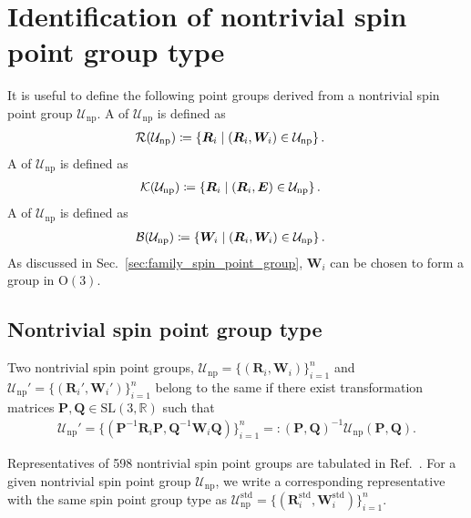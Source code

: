\section{Identification of nontrivial spin point group type}

\todo{}

It is useful to define the following point groups derived from a nontrivial spin point group $\mathcal{U}_{\mathrm{np}}$.
A  of $\mathcal{U}_{\mathrm{np}}$ is defined as
\begin{align}
  \mathcal{R}(\mathcal{U}_{\mathrm{np}})
    &\coloneqq \left\{  \bm{R}_{i}  \mathrel{}\middle|\mathrel{}  (\bm{R}_{i}, \bm{W}_{i}) \in \mathcal{U}_{\mathrm{np}}  \right\}.
\end{align}
A  of $\mathcal{U}_{\mathrm{np}}$ is defined as
\begin{align}
  \mathcal{K}(\mathcal{U}_{\mathrm{np}})
    &\coloneqq \left\{  \bm{R}_{i}  \mathrel{}\middle|\mathrel{}  (\bm{R}_{i}, \bm{E}) \in \mathcal{U}_{\mathrm{np}}  \right\}.
\end{align}
A  of $\mathcal{U}_{\mathrm{np}}$ is defined as
\begin{align}
  \mathcal{B}(\mathcal{U}_{\mathrm{np}})
    &\coloneqq \left\{  \bm{W}_{i}  \mathrel{}\middle|\mathrel{}  (\bm{R}_{i}, \bm{W}_{i}) \in \mathcal{U}_{\mathrm{np}}  \right\}.
\end{align}
As discussed in Sec.~\ref{sec:family_spin_point_group}, $\bm{W}_{i}$ can be chosen to form a group in $\mathrm{O}(3)$.

\subsection{Nontrivial spin point group type}

Two nontrivial spin point groups, $\mathcal{U}_{\mathrm{np}} = \{ (\bm{R}_{i}, \bm{W}_{i}) \}_{i=1}^{n}$ and $\mathcal{U}_{\mathrm{np}}'= \{ (\bm{R}_{i}', \bm{W}_{i}') \}_{i=1}^{n}$ belong to the same  if there exist transformation matrices $\bm{P}, \bm{Q} \in \mathrm{SL}(3, \mathbb{R})$ such that
\begin{align}
  \mathcal{U}_{\mathrm{np}}'
    = \{ (\bm{P}^{-1} \bm{R}_{i} \bm{P}, \bm{Q}^{-1} \bm{W}_{i} \bm{Q}) \}_{i=1}^{n}
    =: (\bm{P}, \bm{Q})^{-1} \mathcal{U}_{\mathrm{np}} (\bm{P}, \bm{Q}).
\end{align}

Representatives of 598 nontrivial spin point groups are tabulated in Ref.~\cite{Litvin:a14103}.
For a given nontrivial spin point group $\mathcal{U}_{\mathrm{np}}$, we write a corresponding representative with the same spin point group type as $\mathcal{U}_{\mathrm{np}}^{\mathrm{std}} = \{ (\bm{R}_{i}^{\mathrm{std}}, \bm{W}_{i}^{\mathrm{std}}) \}_{i=1}^{n}$.

